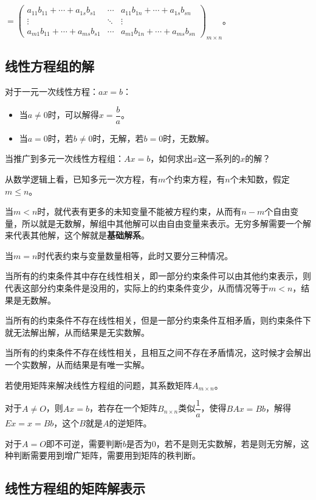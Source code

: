 \documentclass[UTF8, 12pt]{ctexart}
\begin{document}
$=\left(\begin{array}{ccc}
    a_{11}b_{11}+\cdots+a_{1s}b_{s1} & \cdots & a_{11}b_{1n}+\cdots+a_{1s}b_{sn} \\
    \vdots & \ddots & \vdots \\
    a_{m1}b_{11}+\cdots+a_{ms}b_{s1} & \cdots & a_{m1}b_{1n}+\cdots+a_{ms}b_{sn}
\end{array}\right)_{m\times n}\text{。}$

\subsection{线性方程组的解}

对于一元一次线性方程：$ax=b$：

\begin{itemize}
    \item 当$a\neq 0$时，可以解得$x=\dfrac{b}{a}$。
    \item 当$a=0$时，若$b\neq 0$时，无解，若$b=0$时，无数解。
\end{itemize}

当推广到多元一次线性方程组：$Ax=b$，如何求出$x$这一系列的$x$的解？

从数学逻辑上看，已知多元一次方程，有$m$个约束方程，有$n$个未知数，假定$m\leqslant n$。

当$m<n$时，就代表有更多的未知变量不能被方程约束，从而有$n-m$个自由变量，所以就是无数解，解组中其他解可以由自由变量来表示。无穷多解需要一个解来代表其他解，这个解就是\textbf{基础解系}。

当$m=n$时代表约束与变量数量相等，此时又要分三种情况。

当所有的约束条件其中存在线性相关，即一部分约束条件可以由其他约束表示，则代表这部分约束条件是没用的，实际上的约束条件变少，从而情况等于$m<n$，结果是无数解。

当所有的约束条件不存在线性相关，但是一部分约束条件互相矛盾，则约束条件下就无法解出解，从而结果是无实数解。

当所有的约束条件不存在线性相关，且相互之间不存在矛盾情况，这时候才会解出一个实数解，从而结果是有唯一实解。

若使用矩阵来解决线性方程组的问题，其系数矩阵$A_{m\times n}$。

对于$A\neq O$，则$Ax=b$，若存在一个矩阵$B_{n\times n}$类似$\dfrac{1}{a}$，使得$BAx=Bb$，解得$Ex=x=Bb$，这个$B$就是$A$的逆矩阵。

对于$A=O$即不可逆，需要判断$b$是否为0，若不是则无实数解，若是则无穷解，这种判断需要用到增广矩阵，需要用到矩阵的秩判断。

\subsection{线性方程组的矩阵解表示}
\end{document}

